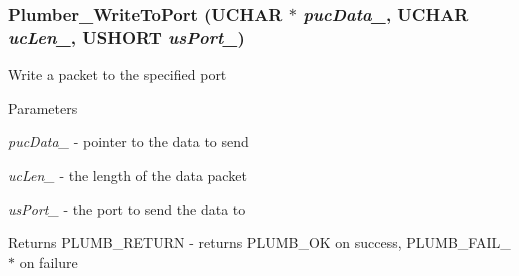 \subsubsection[{Plumber\_\-WriteToPort}]{ Plumber\_\-WriteToPort (UCHAR $\ast$ {\em pucData\_\-}, \/  UCHAR {\em ucLen\_\-}, \/  USHORT {\em usPort\_\-})}\label{plumber_8h_aa0d51bb1846a949a10ac39ba3ff21827}
Write a packet to the specified port


\begin{DoxyParams}{Parameters}
\item[{\em pucData\_\-}]-\/ pointer to the data to send \item[{\em ucLen\_\-}]-\/ the length of the data packet \item[{\em usPort\_\-}]-\/ the port to send the data to \end{DoxyParams}
\begin{DoxyReturn}{Returns}
PLUMB\_\-RETURN -\/ returns PLUMB\_\-OK on success, PLUMB\_\-FAIL\_\-$\ast$ on failure 
\end{DoxyReturn}
